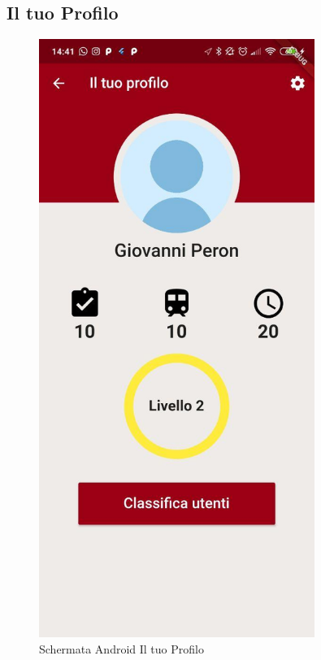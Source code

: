 \subsection{Il tuo Profilo}
\vspace{-\parskip}
\begin{minipage}{0.45\textwidth}
	\begin{figure}[H]
		\centering
		\includegraphics[width=0.8\textwidth]{immagini/profile.jpg}
		\caption{Schermata Android Il tuo Profilo}
	\end{figure}
\end{minipage}
